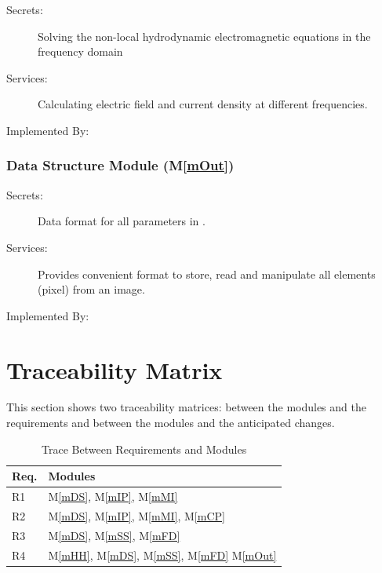 \documentclass[12pt, titlepage]{article}
\newcommand{\mref}[1]{M\ref{#1}}
\begin{document}
\begin{description}
	\item[Secrets:]Solving the non-local hydrodynamic electromagnetic equations in the frequency domain  
	\item[Services:]Calculating electric field and current density at different frequencies. 
	\item[Implemented By:] \progname{}
\end{description}


\subsubsection{Data Structure Module (\mref{mOut})}

\begin{description}
	\item[Secrets:]Data format for all parameters in \progname{}.
	\item[Services:]Provides convenient format to store, read and manipulate all elements (pixel)
	from an image.
	\item[Implemented By:] \progname{}
\end{description}



\section{Traceability Matrix} \label{SecTM}

This section shows two traceability matrices: between the modules and the
requirements and between the modules and the anticipated changes.

\begin{table}[H]
\centering
\begin{tabular}{p{} p{}}
\toprule
\textbf{Req.} & \textbf{Modules}\\
\midrule
R1 & M\ref{mDS}, M\ref{mIP}, M\ref{mMI}\\
R2 & M\ref{mDS}, M\ref{mIP}, M\ref{mMI}, M\ref{mCP}\\
R3 & M\ref{mDS}, M\ref{mSS}, M\ref{mFD}\\
R4 & M\ref{mHH}, M\ref{mDS}, M\ref{mSS}, M\ref{mFD} M\ref{mOut}\\
\bottomrule
\end{tabular}
\caption{Trace Between Requirements and Modules}
\label{TblRT}
\end{table}
\end{document}
